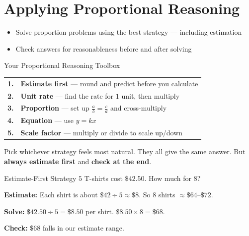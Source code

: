 \section{Applying Proportional Reasoning}

\begin{learningGoals}
\begin{itemize}
    \item Solve proportion problems using the best strategy — including estimation
    \item Check answers for reasonableness before and after solving
\end{itemize}
\end{learningGoals}

\begin{conceptBox}{Your Proportional Reasoning Toolbox}
\begin{center}
\begin{tabular}{c l}
    \textbf{1.} & \textbf{Estimate first} --- round and predict before you calculate \\
    \textbf{2.} & \textbf{Unit rate} --- find the rate for $1$ unit, then multiply \\
    \textbf{3.} & \textbf{Proportion} --- set up $\frac{a}{b} = \frac{c}{d}$ and cross-multiply \\
    \textbf{4.} & \textbf{Equation} --- use $y = kx$ \\
    \textbf{5.} & \textbf{Scale factor} --- multiply or divide to scale up/down \\
\end{tabular}
\end{center}
Pick whichever strategy feels most natural. They all give the same answer. But \textbf{always estimate first} and \textbf{check at the end}.
\end{conceptBox}

\begin{workedExample}{Estimate-First Strategy}
$5$ T-shirts cost $\$42.50$. How much for $8$?

\textbf{Estimate:} Each shirt is about $\$42 \div 5 \approx \$8$. So $8$ shirts $\approx \$64$--$\$72$.

\textbf{Solve:} $\$42.50 \div 5 = \$8.50$ per shirt. $\$8.50 \times 8 = \$68$.

\textbf{Check:} $\$68$ falls in our estimate range. \checkmark
{}
\end{workedExample}

